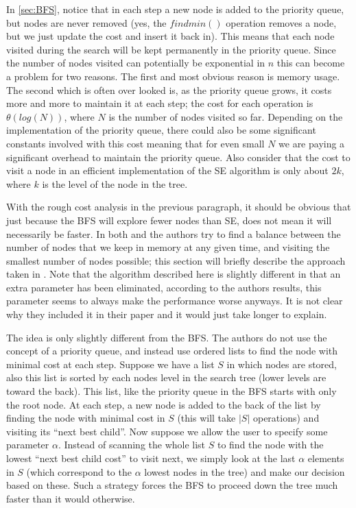 \documentclass[12pt,Bold,letterpaper]{mcgilletdclass}
\begin{document}
In \ref{sec:BFS}, notice that in each step a new node is added to the priority queue, but nodes are never removed (yes, the $findmin()$ operation removes a node, but we just update the cost and insert it back in). This means that each node visited during the search will be kept permanently in the priority queue. Since the number of nodes visited can potentially be exponential in $n$ this can become a problem for two reasons. The first and most obvious reason is memory usage. The second which is often over looked is, as the priority queue grows, it costs more and more to maintain it at each step; the cost for each operation is $\theta(log(N))$, where $N$ is the number of nodes visited so far. Depending on the implementation of the priority queue, there could also be some significant constants involved with this cost meaning that for even small $N$ we are paying a significant overhead to maintain the priority queue. Also consider that the cost to visit a node in an efficient implementation of the SE algorithm is only about $2k$, where $k$ is the level of the node in the tree.

With the rough cost analysis in the previous paragraph, it should be obvious that just because the BFS will explore fewer nodes than SE, does not mean it will necessarily be faster. In both \cite{DaiY08} and \cite{StuBF07} the authors try to find a balance between the number of nodes that we keep in memory at any given time, and visiting the smallest number of nodes possible; this section will briefly describe the approach taken in \cite{StuBF07}. Note that the algorithm described here is slightly different in that an extra parameter has been eliminated, according to the authors results, this parameter seems to always make the performance worse anyways. It is not clear why they included it in their paper and it would just take longer to explain.

The idea is only slightly different from the BFS. The authors do not use the concept of a priority queue, and instead use ordered lists to find the node with minimal cost at each step. Suppose we have a list $S$ in which nodes are stored, also this list is sorted by each nodes level in the search tree (lower levels are toward the back). This list, like the priority queue in the BFS starts with only the root node. At each step, a new node is added to the back of the list by finding the node with minimal cost in $S$ (this will take $|S|$ operations) and visiting its ``next best child''. Now suppose we allow the user to specify some parameter $\alpha$. Instead of scanning the whole list $S$ to find the node with the lowest ``next best child cost'' to visit next, we simply look at the last $\alpha$ elements in $S$ (which correspond to the $\alpha$ lowest nodes in the tree) and make our decision based on these. Such a strategy forces the BFS to proceed down the tree much faster than it would otherwise.
\end{document}
